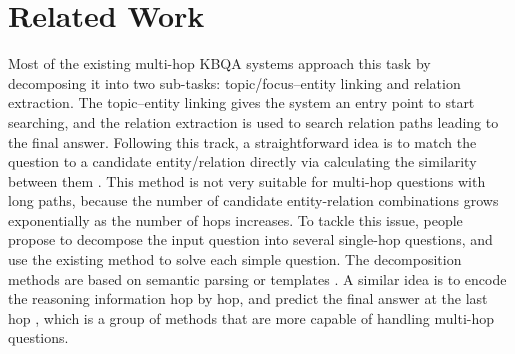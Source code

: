\section{Related Work}

Most of the existing multi-hop KBQA systems %
approach this task by decomposing it into two sub-tasks:
topic/focus--entity linking and relation extraction. The topic--entity linking gives the system an entry point to start searching, and the relation extraction is used to search relation paths leading to the final answer. %
Following this track, a straightforward idea is to match the question to a candidate entity/relation directly via calculating the similarity between them \cite{DBLP:journals/corr/abs-1801-09893,DBLP:conf/adbis/YuHYZW18,DBLP:conf/ijcai/LanW019}. This method is not very suitable for multi-hop questions with long paths, because the number of candidate entity-relation combinations grows exponentially as the number of hops increases. To tackle this issue, people propose to decompose the input question into several single-hop questions, and use the existing method to solve each simple question. The decomposition methods are based on semantic parsing \cite{DBLP:conf/www/AbujabalYRW17,DBLP:conf/emnlp/LuoLLZ18} or templates \cite{DBLP:journals/corr/abs-1908-11053}. A similar idea is to encode the reasoning information hop by hop, and predict the final answer at the last hop \cite{DBLP:conf/emnlp/MillerFDKBW16,DBLP:conf/coling/ZhouHZ18,DBLP:conf/naacl/ChenCCNK19}, which is a group of methods that are more capable of handling multi-hop questions. 
